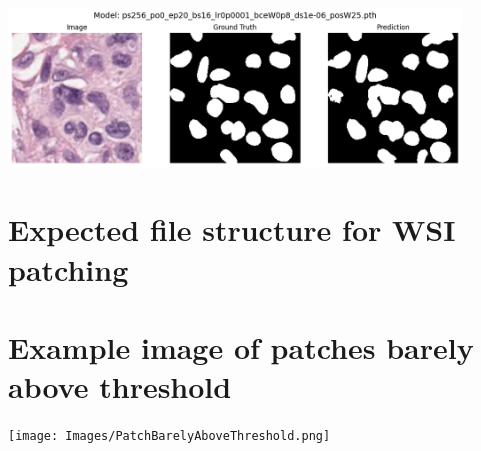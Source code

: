 \documentclass[12pt]{article}
\begin{document}
\includegraphics[width=0.9\textwidth]{Images/pannuke_good.png}

\newpage

\section{Expected file structure for WSI patching} \label{dirtree}


\section{Example image of patches barely above threshold}

\texttt{[image: Images/PatchBarelyAboveThreshold.png]}\label{threshold_image}
\vspace{1cm}
\end{document}
